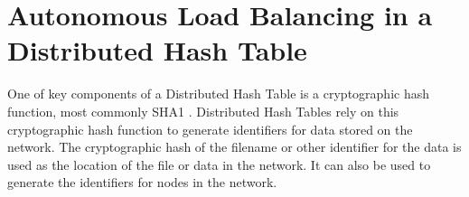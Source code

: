 \chapter{Autonomous Load Balancing in a Distributed Hash Table}
\label{chapter:auto-balance}







%

One of key components of a Distributed Hash Table is a cryptographic hash function, most commonly SHA1 \cite{sha1}.
Distributed Hash Tables rely on this cryptographic hash function to generate identifiers for data stored on the network.
The cryptographic hash of the filename or other identifier for the data is used as the location of the file or data in the network.
It can also be used to generate the identifiers for nodes in the network.

